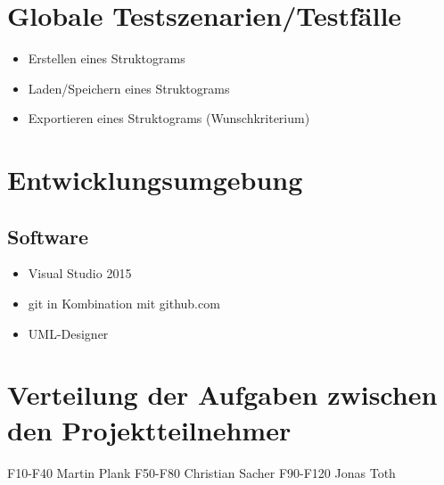 \documentclass[a4paper,10pt]{report}
\begin{document}
\section{Globale Testszenarien/Testfälle}
\begin{itemize}
\item  Erstellen eines Struktograms
\item  Laden/Speichern eines Struktograms
\item  Exportieren eines Struktograms (Wunschkriterium)
\end{itemize}
\section{Entwicklungsumgebung}
\subsection{Software}
\begin{itemize}
\item Visual Studio 2015
\item git in Kombination mit github.com
\item UML-Designer
\end{itemize}
\section{Verteilung der Aufgaben zwischen den Projektteilnehmer}
F10-F40 Martin Plank
F50-F80 Christian Sacher
F90-F120 Jonas Toth
\end{document}
